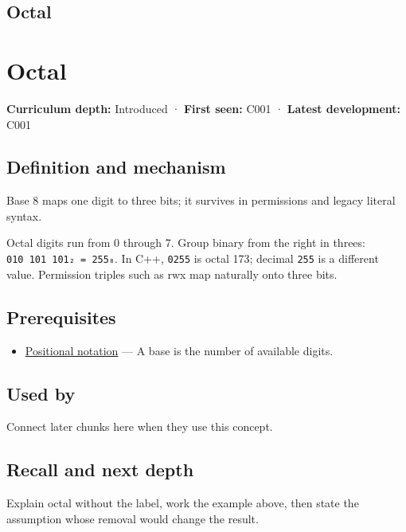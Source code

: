 \hypertarget{appendix-17fc1bc8b305}{}
\section*{Octal}
\chapter{Octal}\label{appendix-17fc1bc8b305-octal}

\textbf{Curriculum depth:} Introduced · \textbf{First seen:} C001 · \textbf{Latest development:} C001

\section{Definition and mechanism}\label{appendix-17fc1bc8b305-definition-and-mechanism}

Base 8 maps one digit to three bits; it survives in permissions and legacy literal syntax.

Octal digits run from 0 through 7. Group binary from the right in threes: \texttt{010\ 101\ 101₂\ =\ 255₈}. In C++, \texttt{0255} is octal 173; decimal \texttt{255} is a different value. Permission triples such as rwx map naturally onto three bits.

\section{Prerequisites}\label{appendix-17fc1bc8b305-prerequisites}

\begin{itemize}
\tightlist
\item
  \hyperref[appendix-83c3f28f7bda]{Positional notation} --- A base is the number of available digits.
\end{itemize}

\section{Used by}\label{appendix-17fc1bc8b305-used-by}

Connect later chunks here when they use this concept.

\section{Recall and next depth}\label{appendix-17fc1bc8b305-recall-and-next-depth}

Explain octal without the label, work the example above, then state the assumption whose removal would change the result.

